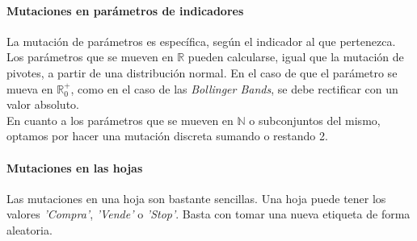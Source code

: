 \paragraph{Mutaciones en par\'ametros de indicadores}
La mutaci\'on de par\'ametros es espec\'ifica, seg\'un el indicador al que pertenezca.\\

Los par\'ametros que se mueven en $\mathbb{R}$ pueden calcularse, igual que la mutaci\'on de pivotes, a partir de una distribuci\'on normal. En el caso de que el par\'ametro se mueva en $\mathbb{R}_0^+$, como en el caso de las \textit{Bollinger Bands}, se debe rectificar con un valor absoluto.\\

En cuanto a los par\'ametros que se mueven en $\mathbb{N}$ o subconjuntos del mismo, optamos por hacer una mutaci\'on discreta sumando o restando 2. 

\paragraph{Mutaciones en las hojas}
Las mutaciones en una hoja son bastante sencillas. Una hoja puede tener los valores \textit{'Compra'}, \textit{'Vende'} o \textit{'Stop'}. Basta con tomar una nueva etiqueta de forma aleatoria.


